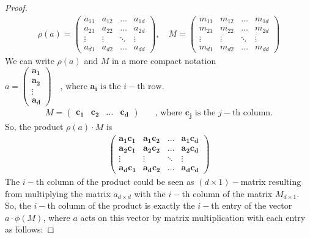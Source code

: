 \begin{proof}
\begin{align*}
\rho(a) = \begin{pmatrix}
    a_{11} & a_{12} & \dots & a_{1d} \\
    a_{21} & a_{22} & \dots & a_{2d}\\
    \vdots  & \vdots & \ddots & \vdots \\
    a_{d1} & a_{d2} & \dots & a_{dd}
\end{pmatrix} , \quad M = \begin{pmatrix}
     m_{11} & m_{12} & \dots & m_{1d} \\
    m_{21} & m_{22} & \dots & m_{2d}\\
    \vdots  & \vdots & \ddots & \vdots \\
    m_{d1} & m_{d2} & \dots & m_{dd}
\end{pmatrix}
\end{align*}
We can write $\rho(a)$ and $M$ in a more compact notation  $a = \begin{pmatrix}
    \mathbf{a_1} \\
    \mathbf{a_2} \\
    \vdots \\
    \mathbf{a_d}
\end{pmatrix} \quad \text{, where $\mathbf{a_i}$ is the $i-$th row}.$ \\
\begin{align*} M = \begin{pmatrix}
    \mathbf{c_1} & \mathbf{c_2} & \dots & \mathbf{c_d}
\end{pmatrix} &\quad \text{, where $\mathbf{c_j}$ is the $j-$th column}. 
\end{align*}
So, the product $\rho(a) \cdot M$ is 
\begin{align*}
    \begin{pmatrix}
        \mathbf{a_1 c_1} & \mathbf{a_1 c_2} & \dots& \mathbf{a_1 c_d} \\
        \mathbf{a_2 c_1} & \mathbf{a_2 c_2} & \dots &\mathbf{a_2 c_d} \\
        \vdots & \vdots & \ddots & \vdots \\
        \mathbf{a_d c_1} & \mathbf{a_d c_2} & \dots  & \mathbf{a_d c_d}
    \end{pmatrix}
\end{align*}
The $i-$th column of the product could be seen as $(d \times 1)-$matrix resulting from multiplying the matrix $a_{d \times d}$ with the $i-$th column of the matrix $M_{d \times 1}$. So, the $i-$th column of the product is exactly the $i-$th entry of the vector $a \cdot \phi(M)$, where $a$ acts on this vector by matrix multiplication with each entry as follows:

\end{proof}
